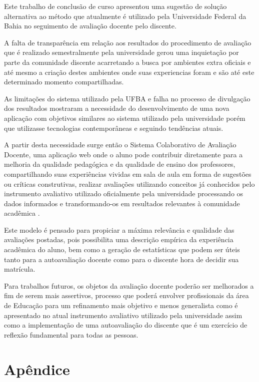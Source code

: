 \documentclass[12pt, a4paper]{report}
\begin{document}
Este trabalho de conclusão de curso apresentou uma sugestão de solução alternativa ao método que atualmente é utilizado pela Universidade Federal da Bahia no seguimento de avaliação docente pelo discente.

A falta de transparência em relação aos resultados do procedimento de avaliação que é realizado semestralmente pela universidade gerou uma inquietação por parte da comunidade discente acarretando a busca por ambientes extra oficiais e até mesmo a criação destes ambientes onde suas experiencias foram e são até este determinado momento compartilhadas.

As limitações do sistema utilizado pela UFBA e falha no processo de divulgação dos resultados mostraram a necessidade do desenvolvimento de uma nova aplicação com objetivos similares ao sistema utilizado pela universidade porém que  utilizasse tecnologias contemporâneas e seguindo tendências atuais. 

A partir desta necessidade surge então o Sistema Colaborativo de Avaliação Docente, uma aplicação web onde o aluno pode contribuir diretamente para a melhoria  da qualidade pedagógica e da qualidade de ensino dos professores, compartilhando suas experiências vividas em sala de aula em forma de sugestões ou críticas construtivas, realizar avaliações utilizando conceitos
já conhecidos pelo instrumento avaliativo utilizado oficialmente pela universidade processando os dados informados e transformando-os em resultados relevantes à comunidade acadêmica .

Este modelo é pensado para propiciar a máxima relevância e qualidade das avaliações postadas, pois possibilita uma descrição empírica da experiência acadêmica do aluno, bem como a geração de estatísticas que podem ser úteis tanto para a autoavaliação docente como para o discente  hora de decidir sua matrícula.

Para trabalhos futuros, os objetos da avaliação docente poderão ser melhorados a fim de serem mais assertivos, processo que poderá envolver profissionais da área de Educação para um refinamento mais objetivo e menos generalista como é apresentado no atual instrumento avaliativo utilizado pela universidade assim como a implementação de uma autoavaliação do discente que é um exercício de reflexão fundamental para todas as pessoas. 

\renewcommand\bibname{Referências}

%
%

\nocite{*}

\appendix
\chapter{Apêndice}
\label{ape:apendice}




\end{document}
